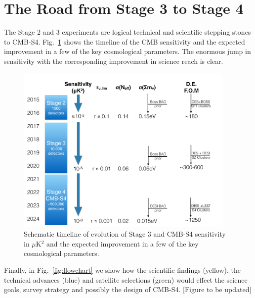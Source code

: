 \section{The Road from Stage 3 to Stage 4}
\label{sec:context}


The Stage 2 and 3 experiments are logical technical and scientific stepping stones to CMB-S4. Fig.~\ref{fig:science_timeline-intro} shows the timeline of the CMB sensitivity and the expected improvement in a few of the key cosmological parameters. The enormous jump in sensitivity with the corresponding improvement in science reach is clear.

\begin{figure}[ht]
\centering \includegraphics[width=0.95\textwidth]{Intro/Fig-FlowChart1_v1.pdf}
\caption{Schematic timeline of evolution of Stage 3 and CMB-S4 
sensitivity in $\mu$K$^2$ and the expected improvement in a few of the key cosmological parameters.}
\label{fig:science_timeline-intro}
\end{figure}

Finally, in Fig.~\ref{fig:flowchart} we show how the scientific findings (yellow), the technical advances (blue) and satellite selections (green) would effect the science goals, survey strategy and possibly the design of CMB-S4.  [Figure to be updated]

